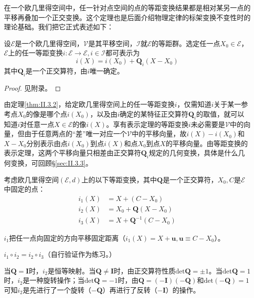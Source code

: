 \documentclass[../main.tex]{subfiles}
\begin{document}
在一个欧几里得空间中，任一针对点空间的点的等距变换结果都是相对某另一点的平移再叠加一个正交变换。这个定理也是后面介绍物理定律的标架变换不变性时的理论基础。我们把它正式表述如下：

\begin{theorem}[等距变换的表示定理]\label{thm:II.3.2}
    设$\mathcal{E}$是一个欧几里得空间，$\mathcal{V}$是其平移空间，$\mathcal{I}$就$\mathcal{E}$的等距群。选定任一点$X_0\in\mathcal{E}$，$\mathcal{E}$上的任一等距变换$i:\mathcal{E}\rightarrow\mathcal{E},i\in\mathcal{I}$都可表示为
    \[
        i\left(X\right)=i\left(X_0\right)+\mathbf{Q}_i\left(X-X_0\right)
    \]
    其中$\mathbf{Q}_i$是一个正交算符，由$i$唯一确定。
\end{theorem}
\begin{proof}
    见附录。
\end{proof}

由定理\ref{thm:II.3.2}，给定欧几里得空间上的任一等距变换$i$，仅需知道$i$关于某一参考点$X_0$的像是哪个点$i\left(X_0\right)$，以及由$i$确定的某特征正交算符$\mathbf{Q}_i$的取值，就可以知道$i$对任意一点$X\in\mathcal{E}$的像$i\left(X\right)$。享有表示定理的等距变换$i$未必需要是$\mathcal{V}$中的向量，但由于任意两点的“差”唯一对应一个$\mathcal{V}$中的平移向量，故$i\left(X\right)-i\left(X_0\right)$和$X-X_0$分别表示由点$i\left(X_0\right)$到点$i\left(X\right)$和点$X_0$到点$X$的平移向量。由等距变换的表示定理，这两个平移向量只相差由正交算符$\mathbf{Q}_i$规定的几何变换，具体是什么几何变换，可回顾\S\ref{sec:II.3.3}。

\begin{example}\label{exp:II.3.4}
    考虑欧几里得空间$\left(\mathcal{E},d\right)$上的以下等距变换，其中$\mathbf{Q}$是一个正交算符，$X_0,C$是$\mathcal{E}$中固定的点：
    \begin{align*}
        i_1\left(X\right) & =X+\left(C-X_0\right)                \\
        i_2\left(X\right) & =X_0+\mathbf{Q}\left(X-X_0\right)    \\
        i_3\left(X\right) & =X+\mathbf{Q}^{-1}\left(C-X_0\right)
    \end{align*}

    $i_1$把任一点向固定的方向平移固定距离（$i_1\left(X\right)=X+\mathbf{u},\mathbf{u}\equiv C-X_0$）。

    $i_1\circ i_2=i_2\circ i_3$（自行验证作为练习。）

    当$\mathbf{Q}=\mathbf{I}$时，$i_2$是恒等映射。当$\mathbf{Q}\neq\mathbf{I}$时，由正交算符性质$\mathrm{det}\mathbf{Q}=\pm 1$。当$\mathrm{det}\mathbf{Q}=1$时，$i_2$是一种旋转操作；当$\mathrm{det}\mathbf{Q}=-1$时，由$\mathbf{Q}=\left(-\mathbf{I}\right)\left(-\mathbf{Q}\right)$和$\mathrm{det}\left(-\mathbf{Q}\right)=1$可知$i_2$是先进行了一个旋转（$-\mathbf{Q}$）再进行了反转（$-\mathbf{I}$）的操作。
\end{example}
\end{document}
